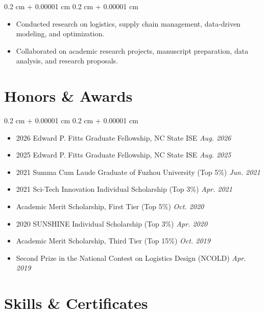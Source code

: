 \documentclass[10pt, letterpaper]{article}
\newenvironment{highlights}{
    \begin{itemize}[
        topsep=0.10 cm,
        parsep=0.10 cm,
        partopsep=0pt,
        itemsep=0pt,
        leftmargin=0.4 cm + 10pt
    ]
}{
    \end{itemize}
} %
\newenvironment{onecolentry}{
    \begin{adjustwidth}{
        0.2 cm + 0.00001 cm
    }{
        0.2 cm + 0.00001 cm
    }
}{
    \end{adjustwidth}
} %
\begin{document}
\begin{onecolentry}
    \begin{highlights}
        \item Conducted research on logistics, supply chain management, data-driven modeling, and optimization.
        \item Collaborated on academic research projects, manuscript preparation, data analysis, and research proposals.
    \end{highlights}
\end{onecolentry}



    
\section{Honors \& Awards}

\vspace{0.10 cm}

\begin{onecolentry}
    \begin{highlights}
        \item 2026 Edward P. Fitts Graduate Fellowship, NC State ISE \hfill \textit{Aug. 2026}
        \item 2025 Edward P. Fitts Graduate Fellowship, NC State ISE \hfill \textit{Aug. 2025}
        \item 2021 Summa Cum Laude Graduate of Fuzhou University (Top 5\%) \hfill \textit{Jun. 2021}
        \item 2021 Sci-Tech Innovation Individual Scholarship (Top 3\%) \hfill \textit{Apr. 2021}
        \item Academic Merit Scholarship, First Tier (Top 5\%) \hfill \textit{Oct. 2020}
        \item 2020 SUNSHINE Individual Scholarship (Top 3\%) \hfill \textit{Apr. 2020}
        \item Academic Merit Scholarship, Third Tier (Top 15\%) \hfill \textit{Oct. 2019}
        \item Second Prize in the National Contest on Logistics Design (NCOLD) \hfill \textit{Apr. 2019}
    \end{highlights}
\end{onecolentry}



    
\section{Skills \& Certificates}
\end{document}
